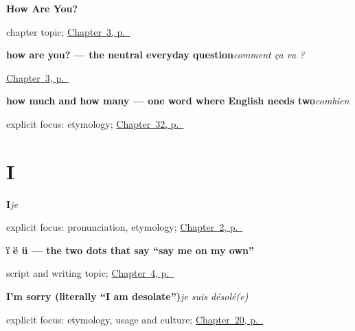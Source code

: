 \noindent\begin{minipage}[t]{\linewidth}
\raggedright
\textbf{How Are You?}\par
\footnotesize chapter topic; \hyperref[ch:how-are-you]{Chapter~3, p.~\pageref*{ch:how-are-you}}
\end{minipage}\par\smallskip

\noindent\begin{minipage}[t]{\linewidth}
\raggedright
\textbf{how are you? — the neutral everyday question}\enspace\emph{comment ça va ?}\par
\footnotesize \hyperref[ch:how-are-you]{Chapter~3, p.~\pageref*{ch:how-are-you}}
\end{minipage}\par\smallskip

\noindent\begin{minipage}[t]{\linewidth}
\raggedright
\textbf{how much and how many — one word where English needs two}\enspace\emph{combien}\par
\footnotesize explicit focus: etymology; \hyperref[ch:fr-questions]{Chapter~32, p.~\pageref*{ch:fr-questions}}
\end{minipage}\par\smallskip

\section*{I}

\noindent\begin{minipage}[t]{\linewidth}
\raggedright
\textbf{I}\enspace\emph{je}\par
\footnotesize explicit focus: pronunciation, etymology; \hyperref[ch:introductions]{Chapter~2, p.~\pageref*{ch:introductions}}
\end{minipage}\par\smallskip

\noindent\begin{minipage}[t]{\linewidth}
\raggedright
\textbf{ï ë ü — the two dots that say \textquotedblleft{}say me on my own\textquotedblright{}}\par
\footnotesize script and writing topic; \hyperref[ch:farewells]{Chapter~4, p.~\pageref*{ch:farewells}}
\end{minipage}\par\smallskip

\noindent\begin{minipage}[t]{\linewidth}
\raggedright
\textbf{I'm sorry (literally \textquotedblleft{}I am desolate\textquotedblright{})}\enspace\emph{je suis désolé(e)}\par
\footnotesize explicit focus: etymology, usage and culture; \hyperref[ch:fr-sorry]{Chapter~20, p.~\pageref*{ch:fr-sorry}}
\end{minipage}\par\smallskip

